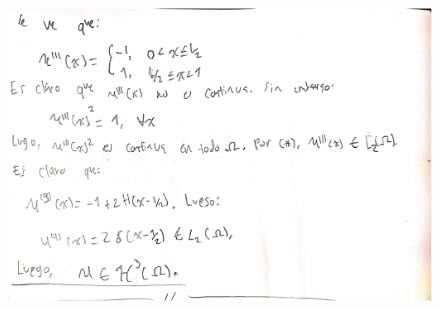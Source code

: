 \documentclass[fleqn]{article}
\begin{document}
\begin{enumerate}
\begin{itemize}
\begin{figure}[H]
           \end{figure}
           \begin{figure}[H]
             \centering \includegraphics[scale=.5]{figs/2a2}
           \end{figure}


\end{itemize}
\end{enumerate}
\end{document}

